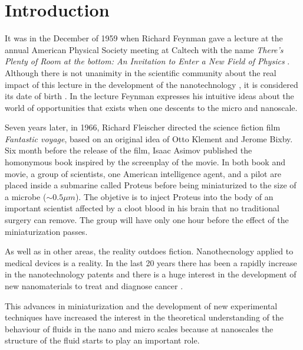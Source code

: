 \documentclass[b5paper,openright,10pt]{book}
\begin{document}
\chapter{Introduction}
\label{Introduction}
\pagestyle{chapters}  %

It was in the December of 1959 when Richard Feynman gave a lecture at the annual American Physical Society meeting at Caltech with the name {\it There's Plenty of Room at the bottom: An Invitation to Enter a New Field of Physics} \cite{Feynman1960}. 
Although there is not unanimity in the scientific community about the real impact of this lecture in the development of the nanotechnology \cite{Nature2009}, it is considered its date of birth \cite{Tourney2008}. 
In the lecture Feynman expresses his intuitive ideas about the world of opportunities that exists when one descents to the micro and nanoscale. 

Seven years later, in 1966, Richard Fleischer directed the science fiction film {\it Fantastic voyage}, based on an original idea of Otto Klement and Jerome Bixby. 
Six month before the release of the film, Isaac Asimov published the homonymous book \cite{Asimov1966} inspired by the screenplay of the movie.  
In both book and movie, a group of scientists, one American intelligence agent, and a pilot are placed inside a submarine called Proteus before being miniaturized to the size of a microbe ($\sim 0.5 \mu m$). The objetive is to inject Proteus into the body of an important scientist affected by a cloot blood in his brain that no traditional surgery can remove. The group will have only one hour before the effect of the miniaturization passes.  

As well as in other areas, the reality outdoes fiction. 
Nanothecnology applied to medical devices is a reality. In the last 20 years there has been a rapidly increase in the nanotechnology patents \cite{Zheng2014} and there is a huge interest in the development of new nanomaterials to treat and diagnose cancer \cite{Nazir2014, Dreaden2012, Kievit2011}. 

This   advances  in   miniaturization  and   the  development   of  new
experimental techniques have  increased the
interest in the  theoretical understanding of the  behaviour of fluids in the nano \cite{Bocquet2010,KarniadakisBook2005} and micro \cite{Lauga2005, Bocquet2011,KarniadakisBook2005} scales because at nanoscales  the structure  of the  fluid starts to play an  important
role.   
\end{document}
